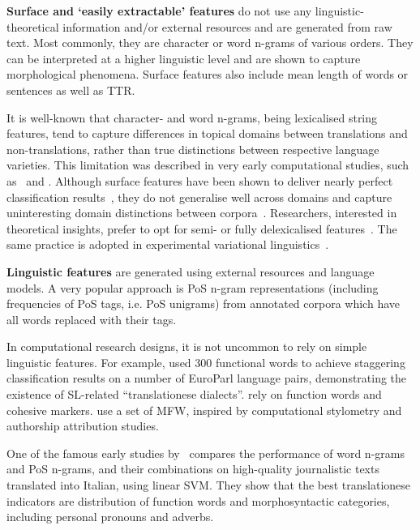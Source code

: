 \textbf{Surface and `easily extractable' features} do not use any linguistic-theoretical information and/or external resources and are generated from raw text. Most commonly, they are character or word n-grams of various orders. They can be interpreted at a higher linguistic level and are shown to capture morphological phenomena.
Surface features also include mean length of words or sentences as well as \gls{TTR}. 

It is well-known that character- and word n-grams, being lexicalised string features, tend to capture differences in topical domains between translations and non-translations, rather than true distinctions between respective language varieties. This limitation was described in very early computational studies, such as~\citet{Baroni2005} and \citet{VanHalteren2008}. Although surface features have been shown to deliver nearly perfect classification results~\cite{Popescu2011}, they do not generalise well across domains and capture uninteresting domain distinctions between corpora~\cite{Eetemadi2015}. Researchers, interested in theoretical insights, prefer to opt for semi- or fully delexicalised features~\cite{Lapshinova2018,Nikolaev2020,Hu2021}. The same practice is adopted in experimental variational linguistics~\cite{Diwersy2014}.

\textbf{Linguistic features} are generated using external resources and language models. A very popular approach is \gls{PoS} n-gram representations (including frequencies of PoS tags, i.e. PoS unigrams) from annotated corpora which have all words replaced with their tags. 

In computational research designs, it is not uncommon to rely on simple linguistic features. For example, \citet{Koppel2011} used 300 functional words to achieve staggering classification results on a number of EuroParl language pairs, demonstrating the existence of SL-related ``translationese dialects''. \citet{Rabinovich2015} rely on function words and cohesive markers. \citet{Nisioi2013} use a set of \gls{MFW}, inspired by computational stylometry and authorship attribution studies.

One of the famous early studies by~\citet{Baroni2006} compares the performance of word n-grams and PoS n-grams, and their combinations on high-quality journalistic texts translated into Italian, using linear \gls{SVM}. They show that the best translationese indicators are distribution of function words and morphosyntactic categories, including personal pronouns and adverbs.

